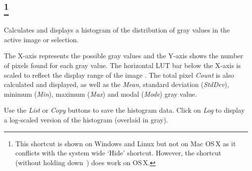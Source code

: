 \subsection[{\protect\userinterface{Histogram {[}h{]}}}]{\protect{}%
\footnote{This shortcut is shown on Windows and Linux but not on Mac OS\,X
as it conflicts with the system wide `Hide' shortcut. However, the
\protect{} shortcut (without holding down \protect{}\,)
does work on OS\,X.%
}\label{sub:Histogram}}

Calculates and displays a histogram of the distribution of gray values
in the active image or selection.

The X-axis represents the possible gray values and the Y-axis shows
the number of pixels found for each gray value. The horizontal LUT
bar below the X-axis is scaled to reflect the display range of the
image \cite{C-Histogram}. The total pixel \emph{Count} is also calculated
and displayed, as well as the \emph{Mean}, standard deviation (\emph{StdDev}),
minimum (\emph{Min}), maximum (\emph{Max}) and modal (\emph{Mode})
gray value.

Use the \emph{List} or \emph{Copy} buttons to save the histogram
data. Click on \emph{Log} to display a log-scaled version of the histogram
(overlaid in gray).

